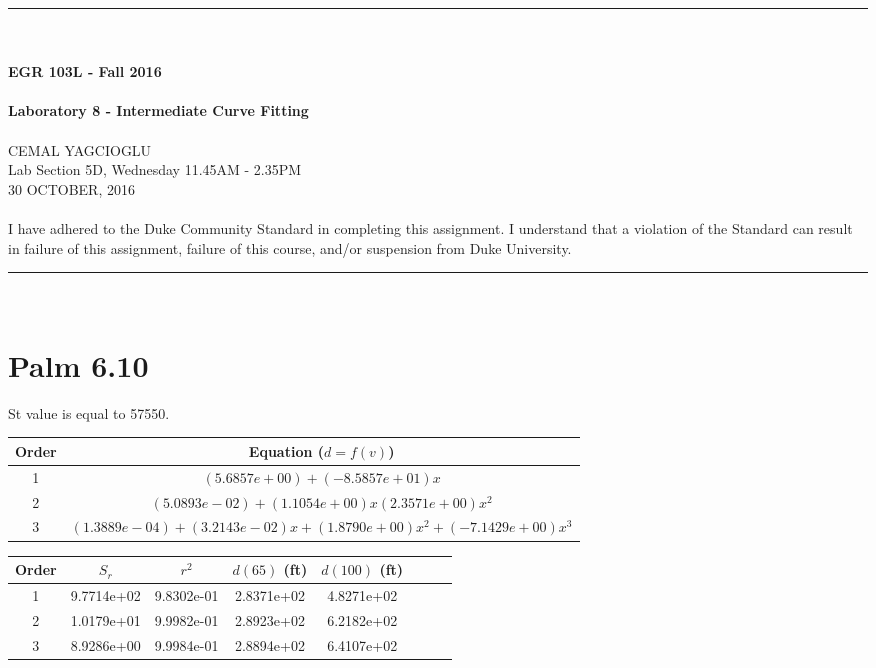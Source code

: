 \documentclass{article}
\begin{document}
\begin{center}
\rule{6.5in}{0.5mm}\\~\\
{\bf \large EGR 103L - Fall 2016}\\~\\
{\huge \bf Laboratory 8 - Intermediate Curve Fitting}\\~\\
CEMAL YAGCIOGLU\\
Lab Section 5D, Wednesday 11.45AM - 2.35PM\\
30 OCTOBER, 2016\\~\\
{\small I have adhered to the Duke Community Standard in completing
  this assignment.  I understand that a violation of the Standard can
  result in failure of this assignment, failure of this course, and/or
  suspension from Duke University.} 
\rule{6.5in}{0.5mm}\\
\end{center}
\tableofcontents
\listoffigures
\pagebreak
\renewcommand{\arraystretch}{1.5}

\section{Palm 6.10}
St value is equal to 57550.
\begin{center}
\begin{tabular}{|c|c|} \hline
Order & Equation ($d=f(v)$)\\ \hline
1 & $(5.6857e+00) + (-8.5857e+01)x$ \\ \hline
2 & $(5.0893e-02) + (1.1054e+00)x   (2.3571e+00)x^2$ \\ \hline
3 & $(1.3889e-04) + (3.2143e-02)x + (1.8790e+00)x^2 + (-7.1429e+00)x^3$ \\ \hline
\end{tabular}
\end{center}

\begin{center}
\begin{tabular}{|c|c|c|c|c|c|c|c|} \hline
Order & $S_r$ & $r^2$ & $d(65)$ (ft) &
$d(100)$ (ft)\\ \hline
1 & 9.7714e+02 & 9.8302e-01 & 2.8371e+02 & 4.8271e+02 \\ \hline
2 & 1.0179e+01 & 9.9982e-01 & 2.8923e+02 & 6.2182e+02 \\ \hline
3 & 8.9286e+00 & 9.9984e-01 & 2.8894e+02 & 6.4107e+02 \\ \hline
\end{tabular}
\end{center}
\end{document}
